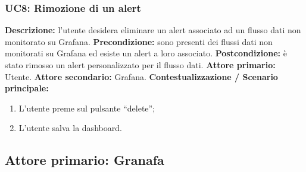                 \subsubsection{UC8: Rimozione di un alert}
                    \textbf{Descrizione:}  l’utente desidera eliminare un alert associato ad un flusso dati non monitorato su Grafana.
                    \newline
                    \textbf{Precondizione:} sono presenti dei flussi dati non monitorati su Grafana ed esiste un alert a loro associato.
                    \newline
                    \textbf{Postcondizione:} è stato rimosso un alert personalizzato per il flusso dati.
                    \newline
                    \textbf{Attore primario:} Utente.
                    \newline
                    \textbf{Attore secondario:} Grafana.
                    \newline
                    \textbf{Contestualizzazione / Scenario principale:} \begin{enumerate}
                            \item L’utente preme sul pulsante “delete”;
                            \item L’utente salva la dashboard.
                        \end{enumerate}
				
		\subsection{Attore primario: Granafa}	
		
